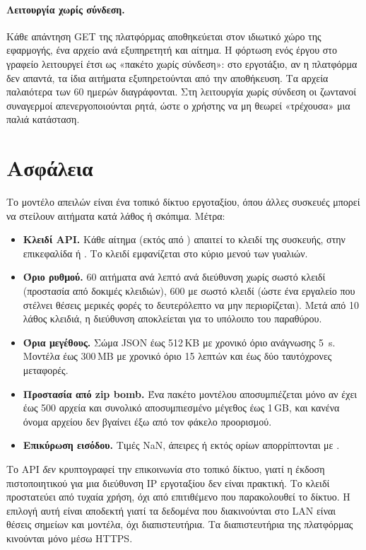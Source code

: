 \paragraph{Λειτουργία χωρίς σύνδεση.} Κάθε απάντηση GET της πλατφόρμας αποθηκεύεται στον ιδιωτικό χώρο της εφαρμογής, ένα αρχείο ανά εξυπηρετητή και αίτημα. Η φόρτωση ενός έργου στο γραφείο λειτουργεί έτσι ως «πακέτο χωρίς σύνδεση»: στο εργοτάξιο, αν η πλατφόρμα δεν απαντά, τα ίδια αιτήματα εξυπηρετούνται από την αποθήκευση. Τα αρχεία παλαιότερα των 60 ημερών διαγράφονται. Στη λειτουργία χωρίς σύνδεση οι ζωντανοί συναγερμοί απενεργοποιούνται ρητά, ώστε ο χρήστης να μη θεωρεί «τρέχουσα» μια παλιά κατάσταση.

\section{Ασφάλεια}
\label{sec:security}

Το μοντέλο απειλών είναι ένα τοπικό δίκτυο εργοταξίου, όπου άλλες συσκευές μπορεί να στείλουν αιτήματα κατά λάθος ή σκόπιμα. Μέτρα:
\begin{itemize}
  \item \textbf{Κλειδί API.} Κάθε αίτημα (εκτός από ) απαιτεί το κλειδί της συσκευής, στην επικεφαλίδα  ή . Το κλειδί εμφανίζεται στο κύριο μενού των γυαλιών.
  \item \textbf{Όριο ρυθμού.} 60 αιτήματα ανά λεπτό ανά διεύθυνση χωρίς σωστό κλειδί (προστασία από δοκιμές κλειδιών), 600 με σωστό κλειδί (ώστε ένα εργαλείο που στέλνει θέσεις μερικές φορές το δευτερόλεπτο να μην περιορίζεται). Μετά από 10 λάθος κλειδιά, η διεύθυνση αποκλείεται για το υπόλοιπο του παραθύρου.
  \item \textbf{Όρια μεγέθους.} Σώμα JSON έως 512\,KB με χρονικό όριο ανάγνωσης \SI{5}{s}. Μοντέλα έως 300\,MB με χρονικό όριο 15 λεπτών και έως δύο ταυτόχρονες μεταφορές.
  \item \textbf{Προστασία από zip bomb.} Ένα πακέτο μοντέλου αποσυμπιέζεται μόνο αν έχει έως 500 αρχεία και συνολικό αποσυμπιεσμένο μέγεθος έως 1\,GB, και κανένα όνομα αρχείου δεν βγαίνει έξω από τον φάκελο προορισμού.
  \item \textbf{Επικύρωση εισόδου.} Τιμές NaN, άπειρες ή εκτός ορίων απορρίπτονται με .
\end{itemize}

Το API \emph{δεν} κρυπτογραφεί την επικοινωνία στο τοπικό δίκτυο, γιατί η έκδοση πιστοποιητικού για μια διεύθυνση IP εργοταξίου δεν είναι πρακτική. Το κλειδί προστατεύει από τυχαία χρήση, όχι από επιτιθέμενο που παρακολουθεί το δίκτυο. Η επιλογή αυτή είναι αποδεκτή γιατί τα δεδομένα που διακινούνται στο LAN είναι θέσεις σημείων και μοντέλα, όχι διαπιστευτήρια. Τα διαπιστευτήρια της πλατφόρμας κινούνται μόνο μέσω HTTPS.

